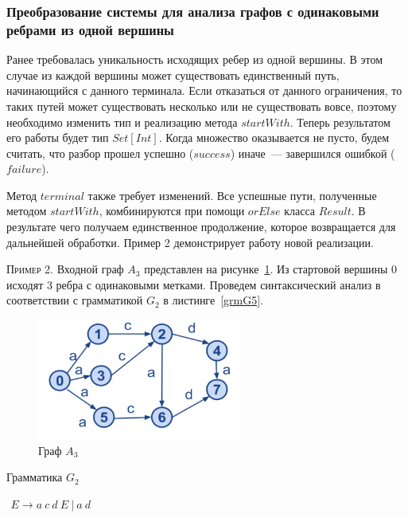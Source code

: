 \subsubsection{Преобразование системы для анализа графов с одинаковыми ребрами из одной вершины}


Ранее требовалась уникальность исходящих ребер из одной вершины. В этом случае из каждой вершины может существовать единственный путь, начинающийся с данного терминала. Если отказаться от данного ограничения, то таких путей может существовать несколько или не существовать вовсе, поэтому необходимо изменить тип и реализацию метода $startWith$. Теперь результатом его работы будет тип $Set[Int]$. Когда множество оказывается не пусто, будем считать, что разбор прошел успешно ($success$) иначе~--- завершился ошибкой ($failure$).

Метод $terminal$ также требует изменений. Все успешные пути, полученные методом $startWith$, комбинируются при помощи $orElse$ класса
$Result$. В результате чего получаем единственное продолжение, которое возвращается для дальнейшей обработки. Пример 2 демонстрирует работу новой реализации.

\textsc{Пример 2.} 
Входной граф $A_3$ представлен на рисунке~\ref{Graph3}. Из стартовой вершины 0 исходят 3 ребра с одинаковыми метками. Проведем синтаксический анализ в соответствии с грамматикой $G_2$ в листинге~\ref{grmG5}.

\begin{figure}
 \centering
 \includegraphics[width=0.6\textwidth]{Smolina/pics/Graph3.png}
 \caption{Граф $A_3$}
 \label{Graph3}
\end{figure}

\begin{listing}
\caption{Грамматика $G_2$}
\label{grmG5}
\centering
$\begin{array}{rl}
E \rightarrow a \ c \ d \ E \ | \ a \ d
\end{array}$
 \end{listing}


